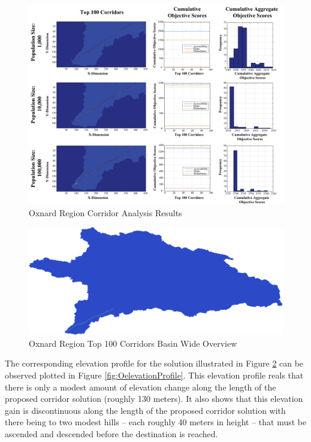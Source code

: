         \begin{figure}[!h]
            \begin{center}
            \includegraphics[width=6in]{figures/Oxnard_PathwayResults.png}   
            \caption{Oxnard Region Corridor Analysis Results}
            \label{fig:Oresults}
            \end{center}
        \end{figure}

        \begin{figure}[!h]
            \begin{center}
            \includegraphics[width=5.5in]{figures/Oxnard_PathwayLarge.png}   
            \caption{Oxnard Region Top 100 Corridors Basin Wide Overview}
            \label{fig:OsolutionOverview}
            \end{center}
        \end{figure}
        
The corresponding elevation profile for the solution illustrated in Figure \ref{fig:OsolutionOverview} can be observed plotted in Figure \ref{fig:OelevationProfile}. This elevation profile reals that there is only a modest amount of elevation change along the length of the proposed corridor solution (roughly 130 meters). It also shows that this elevation gain is discontinuous along the length of the proposed corridor solution with there being to two modest hills -- each roughly 40 meters in height -- that must be ascended and descended before the destination is reached. 
        
